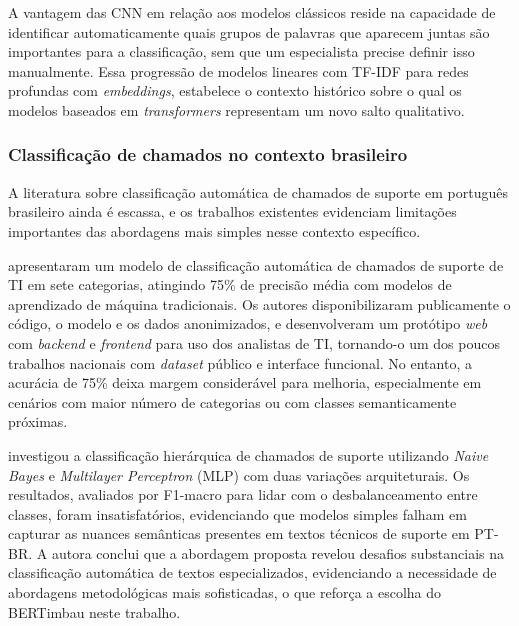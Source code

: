 \documentclass[
    12pt,                %
    openright,           %
    oneside,             %
    a4paper,             %
    english,             %
    brazil               %
]{abntex2}
\begin{document}
A vantagem das CNN em relação aos modelos clássicos reside na capacidade de identificar automaticamente quais grupos de palavras que aparecem juntas são importantes para a classificação, sem que um especialista precise definir isso manualmente. Essa progressão de modelos lineares com TF-IDF para redes profundas com \textit{embeddings}, estabelece o contexto histórico sobre o qual os modelos baseados em \textit{transformers} representam um novo salto qualitativo.

\subsubsection{Classificação de chamados no contexto brasileiro}
\label{subsubsec:helpdesk_brasil}

A literatura sobre classificação automática de chamados de suporte em português brasileiro ainda é escassa, e os trabalhos existentes evidenciam limitações importantes das abordagens mais simples nesse contexto específico.

 apresentaram um modelo de classificação automática de chamados de suporte de TI em sete categorias, atingindo 75\% de precisão média com modelos de aprendizado de máquina tradicionais. Os autores disponibilizaram publicamente o código, o modelo e os dados anonimizados, e desenvolveram um protótipo \textit{web} com \textit{backend} e \textit{frontend} para uso dos analistas de TI, tornando-o um dos poucos trabalhos nacionais com \textit{dataset} público e interface funcional. No entanto, a acurácia de 75\% deixa margem considerável para melhoria, especialmente em cenários com maior número de categorias ou com classes semanticamente próximas.

 investigou a classificação hierárquica de 
chamados de suporte utilizando \textit{Naive Bayes} e 
\textit{Multilayer Perceptron} (MLP) com duas variações arquiteturais. 
Os resultados, avaliados por F1-macro para lidar com o 
desbalanceamento entre classes, foram insatisfatórios, evidenciando 
que modelos simples falham em capturar as nuances semânticas presentes 
em textos técnicos de suporte em PT-BR. A autora conclui que a 
abordagem proposta revelou desafios substanciais na classificação 
automática de textos especializados, evidenciando a necessidade de 
abordagens metodológicas mais sofisticadas, o que reforça a escolha 
do BERTimbau neste trabalho.

\end{document}
